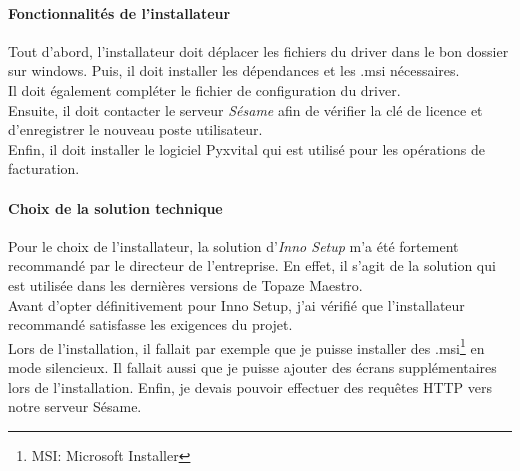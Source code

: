 \paragraph*{Fonctionnalités de l'installateur}
Tout d'abord, l'installateur doit déplacer les fichiers du driver dans le bon dossier sur windows. Puis, il doit installer les dépendances et les .msi nécessaires.\\ 
Il doit également compléter le fichier de configuration du driver. \\
Ensuite, il doit contacter le serveur \textit{Sésame} afin de vérifier la clé de licence et d'enregistrer le nouveau poste utilisateur. \\
Enfin, il doit installer le logiciel Pyxvital qui est utilisé pour les opérations de facturation.


\paragraph*{Choix de la solution technique}
Pour le choix de l'installateur, la solution d'\textit{Inno Setup} m'a été fortement recommandé par le directeur de l'entreprise. En effet, il s'agit de la solution qui est utilisée dans les dernières versions de Topaze Maestro.\\
Avant d'opter définitivement pour Inno Setup, j'ai vérifié que l'installateur recommandé satisfasse les exigences du projet.\\ Lors de l'installation, il fallait par exemple que je puisse installer des .msi\footnote{MSI: Microsoft Installer} en mode silencieux. Il fallait aussi que je puisse ajouter des écrans supplémentaires lors de l'installation. Enfin, je devais pouvoir effectuer des requêtes HTTP vers notre serveur Sésame.


